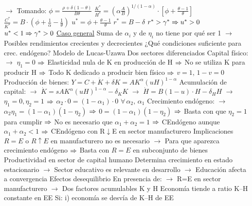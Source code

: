 \documentclass{nuevotema}
\begin{document}
\begin{esquemal}
				\4[] $\to$ Tomando: $\phi= \frac{\rho + \delta(1-\theta)}{B \theta}$
				\4[] $\frac{K^*}{H^*} = \left( \alpha \frac{A}{B} \right)^{1/(1-\alpha)} \cdot \left[ \phi + \frac{\theta - 1}{\theta}\right]$
				\4[] $\frac{C^*}{K^*} = B \cdot \left( \phi + \frac{1}{\alpha} - \frac{1}{\theta} \right)$
				\4[] $u^* = \phi + \frac{\theta - 1}{\theta}$
				\4[] $r^* = B - \delta$
				\4[] 
				\4[] $r^* > \gamma^* \Rightarrow u^* > 0$
				\4[] $u^* < 1 \Rightarrow \gamma^* > 0$
				\4 \underline{Caso general}
				\4[] Suma de $\alpha_i$ y de $\eta_i$ no tiene por qué ser 1
				\4[] $\to$ Posibles rendimientos crecientes y decrecientes
				\4[] ¿Qué condiciones suficiente para crec. endógeno?
				\4[] 
				\4 Modelo de Lucas-Uzawa
				\4[] Dos sectores diferenciados
				\4[] Capital físico:
				\4[] $\to$ $\eta_1 = 0$
				\4[] $\Rightarrow$ Elasticidad nula de K en producción de H
				\4[] $\Rightarrow$ No se utiliza K para producir H
				\4[] $\Rightarrow$ Todo K dedicado a producir bien físico
				\4[] $\Rightarrow$ $v=1$, $1-v=0$
				\4[] Producción de bienes:
				\4[] $Y = C + \dot{K} + \delta K = AK^\alpha (uH)^{1-\alpha}$
				\4[] Acumulación de capital:
				\4[] $\to$ $\dot{K}  = s AK^\alpha (uH)^{1-\alpha} - \delta_K K$
				\4[] $\to$ $\dot{H} = B \left( 1-u \right) \cdot H - \delta_H H$
				\4[] $\to$ $\eta_1=0, \eta_2=1$
				\4[] $\Rightarrow$ $\alpha_2 \cdot 0 = (1-\alpha_1 ) \cdot 0$ $\forall \, \alpha_2, \, \alpha_1$
				\4[] Crecimiento endógeno:
				\4[] $\to$ $\alpha_2 \eta_1 = (1-\alpha_1)(1-\eta_2)$
				\4[] $\Rightarrow$ $ 0 = (1-\alpha_1)(1-\eta_2)$
				\4[] $\Rightarrow$ Basta con que $\eta_2=1$ para cumplir
				\4[] $\Rightarrow$ No es necesario que $\alpha_1+\alpha_2 = 1$
				\4[] $\Rightarrow$ CEndógeno aunque $\alpha_1 + \alpha_2 < 1$
				\4[] $\Rightarrow$ CEndógeno con R$\downarrow$E en sector manufacturero
			\3 Implicaciones
				\4 $R=E$ o $R \uparrow E$ en manufacturero no es necesario
				\4[] $\to$ Para que aparezca crecimiento endógeno
				\4[] $\Rightarrow$ Basta con $R=E$ en subconjunto de bienes
				\4 Productividad en sector de capital humano
				\4[] Determina crecimiento en estado estacionario
				\4[] $\to$ Sector educativo es relevante en desarrollo
				\4[] $\to$ Educación afecta a convergencia
				\4 Efectos desequilibrio
				\4[] En presencia de:
				\4[] $\to$ R=E en sector manufacturero
				\4[] $\to$ Dos factores acumulables K y H
				\4[] Economía tiende a ratio K--H constante en EE
				\4[] Si:
				\4[] i) economía se desvía de K--H de EE

\end{esquemal}
\end{document}
